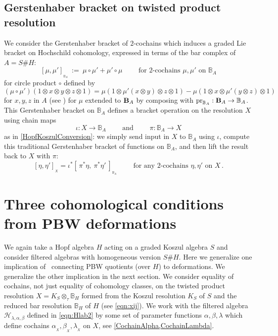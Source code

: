 \documentclass[11pt]{amsart}
\numberwithin{equation}{section}
\newcommand{\X}{_X}
\newcommand{\alphax}{\alpha_{\X}}
\newcommand{\betax}{\beta_{\X}}
\newcommand{\lambdax}{\lambda_{\X}}
\newcommand{\chabl}{\cH_{\lambda,\alpha,\beta}}
\newcommand{\pr}{ {\rm{pr}} }%
\newcommand{\B}{{\bf B}} %
\newcommand{\BB}{\mathbb{B}} %
\renewcommand{\_}[1]{\mbox{$_{\left( #1 \right)}$}}
\newcommand{\ot}{\otimes}
\newcommand{\ott}{\otimes_{\tau}}
\newcommand{\Ho}{H}%
\newcommand{\cH}{\mathcal{H}}
\begin{document}
{ \subsection*{Gerstenhaber bracket on twisted product resolution}
\label{subsec:Gb} 
We consider the Gerstenhaber bracket of $2$-cochains
which induces a graded Lie bracket on
Hochschild cohomology,
expressed in terms of the bar complex of $A=S\# H$:
$$
[\mu,\mu']_{_{\BB_{\! A } }}\  :=\  \mu\circ \mu' + \mu'\circ \mu
\qquad\text{ for $2$-cochains } \mu, \mu' \text{ on } \BB_A
$$
for circle product $\circ$ defined by
\begin{equation}\label{circle-prod-defn}
  (\mu\circ\mu' )( 1\ot x\ot y\ot z \ot 1) 
  = \mu(1\ot\mu'(x\ot y) \ot z\ot 1) -
  \mu (1\ot x\ot \mu'(y\ot z)\ot 1)
\end{equation}
for $x,y,z$ in $A$
(see \cite{GerstenhaberSchack})
for $\mu$ extended to $\B_A$ by composing with
$\pr_{\BB_A}:\B_A\rightarrow \BB_A$.
This Gerstenhaber bracket on $\BB_A$ defines a bracket operation
on the resolution $X$
using chain maps $$\iota :X\longrightarrow \BB_A
\qquad\text{ and }\qquad
\pi : \BB_A\longrightarrow X$$ as in  
\cref{HopfKoszulConversion}: we simply send
input in $X$ to
$\BB_A$ using $\iota$, compute  this 
traditional Gerstenhaber bracket of functions on $\BB_A$, 
and then lift the result back to $X$ with $\pi$:
\begin{equation}\label{eqn:Xbracket}
[\eta, \eta']_{\X} = \iota^*[\, \pi^*\eta,\ \pi^*\eta'\ ]_{_{\BB_{\! A}}}
\qquad\text{ for any $2$-cochains } \eta, \eta' \text{ on } X
\, .
\end{equation}
 

\section{Three cohomological conditions from PBW deformations}
\label{sec:ThreeFromPBW}

We again take a Hopf algebra $\Ho$ acting on a graded Koszul 
algebra $S$ and
consider filtered algebras with homogeneous version $S\# H$.
Here we generalize one implication 
of~\cite[Theorem 5.3]{SW-Koszul}
connecting PBW quotients (over $H$)
to deformations.  We generalize the other implication in the
next section.  We consider equality of
cochains,
not just equality of cohomology classes,
on the twisted product resolution $X=K_S\ott \BB_\Ho$
formed from the Koszul resolution 
  $K_S$ of $S$ and the reduced bar resolution $\BB_\Ho$
  of $H$  (see \cref{eqn:xij}).
 We work with
the filtered algebra $\chabl$ defined in 
\cref{eqn:Hlab2} by some set of parameter functions 
$\alpha,\beta,\lambda$
which define cochains $\alphax, \betax, \lambdax$ on $X$, 
see \cref{CochainAlpha,CochainLambda}.


}
\end{document}
